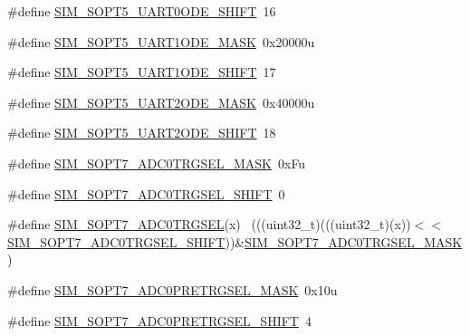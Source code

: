 \begin{DoxyCompactItemize}
\item 
\#define \hyperlink{group___s_i_m___register___masks_gaa972dcd4d7e6d7a72e9da197afd19f03}{S\+I\+M\+\_\+\+S\+O\+P\+T5\+\_\+\+U\+A\+R\+T0\+O\+D\+E\+\_\+\+S\+H\+I\+FT}~16
\item 
\#define \hyperlink{group___s_i_m___register___masks_ga8b6934ad333eab03eb0884605ae53383}{S\+I\+M\+\_\+\+S\+O\+P\+T5\+\_\+\+U\+A\+R\+T1\+O\+D\+E\+\_\+\+M\+A\+SK}~0x20000u
\item 
\#define \hyperlink{group___s_i_m___register___masks_gaefef8a191a226bed4aaa950f3ea66e3e}{S\+I\+M\+\_\+\+S\+O\+P\+T5\+\_\+\+U\+A\+R\+T1\+O\+D\+E\+\_\+\+S\+H\+I\+FT}~17
\item 
\#define \hyperlink{group___s_i_m___register___masks_ga2b5bbe588bc3ea2299deead3e18b3932}{S\+I\+M\+\_\+\+S\+O\+P\+T5\+\_\+\+U\+A\+R\+T2\+O\+D\+E\+\_\+\+M\+A\+SK}~0x40000u
\item 
\#define \hyperlink{group___s_i_m___register___masks_gad3283784bd7916c036b2299401fa7468}{S\+I\+M\+\_\+\+S\+O\+P\+T5\+\_\+\+U\+A\+R\+T2\+O\+D\+E\+\_\+\+S\+H\+I\+FT}~18
\item 
\#define \hyperlink{group___s_i_m___register___masks_gaeda70babef834cacace2c775d62bb4ae}{S\+I\+M\+\_\+\+S\+O\+P\+T7\+\_\+\+A\+D\+C0\+T\+R\+G\+S\+E\+L\+\_\+\+M\+A\+SK}~0x\+Fu
\item 
\#define \hyperlink{group___s_i_m___register___masks_ga914ced2a5cf4e7f37371d52d34d4a930}{S\+I\+M\+\_\+\+S\+O\+P\+T7\+\_\+\+A\+D\+C0\+T\+R\+G\+S\+E\+L\+\_\+\+S\+H\+I\+FT}~0
\item 
\#define \hyperlink{group___s_i_m___register___masks_ga3688192d4b3dce98ac9b670242a38b23}{S\+I\+M\+\_\+\+S\+O\+P\+T7\+\_\+\+A\+D\+C0\+T\+R\+G\+S\+EL}(x)                                ~(((uint32\+\_\+t)(((uint32\+\_\+t)(x))$<$$<$\hyperlink{group___s_i_m___register___masks_ga914ced2a5cf4e7f37371d52d34d4a930}{S\+I\+M\+\_\+\+S\+O\+P\+T7\+\_\+\+A\+D\+C0\+T\+R\+G\+S\+E\+L\+\_\+\+S\+H\+I\+FT}))\&\hyperlink{group___s_i_m___register___masks_gaeda70babef834cacace2c775d62bb4ae}{S\+I\+M\+\_\+\+S\+O\+P\+T7\+\_\+\+A\+D\+C0\+T\+R\+G\+S\+E\+L\+\_\+\+M\+A\+SK})
\item 
\#define \hyperlink{group___s_i_m___register___masks_ga74544c6c9d4fbc593884681ac79c796f}{S\+I\+M\+\_\+\+S\+O\+P\+T7\+\_\+\+A\+D\+C0\+P\+R\+E\+T\+R\+G\+S\+E\+L\+\_\+\+M\+A\+SK}~0x10u
\item 
\#define \hyperlink{group___s_i_m___register___masks_gaee870f942318f14376ee9e6d5558e2ff}{S\+I\+M\+\_\+\+S\+O\+P\+T7\+\_\+\+A\+D\+C0\+P\+R\+E\+T\+R\+G\+S\+E\+L\+\_\+\+S\+H\+I\+FT}~4
\item 
$$
\end{DoxyCompactItemize}
